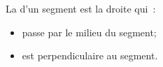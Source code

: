 La  d'un segment est la droite qui~:
\begin{itemize}
    \item passe par le milieu du segment;
    \item est perpendiculaire au segment.
\end{itemize}